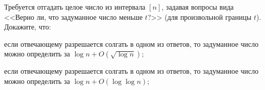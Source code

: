 Требуется отгадать целое число из интервала $[n]$, задавая вопросы вида <<Верно ли, что задуманное число
меньше $t$?>> (для произвольной границы $t$). Докажите, что:
\begin{enumcyr}
    \item если отвечающему разрешается солгать в одном из ответов, то задуманное число
        можно определить за $\log n + O(\sqrt{\log n})$;
    \item если отвечающему разрешается солгать в одном из ответов, то задуманное число
        можно определить за $\log n + O(\log\log n)$;
\end{enumcyr}